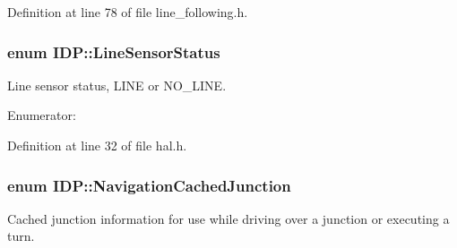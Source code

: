 Definition at line 78 of file line\_\-following.h.

\hypertarget{namespaceIDP_afc3b1d4cbb313bfc854f49d6f23b25f7}{
\subsubsection[{LineSensorStatus}]{\setlength{\rightskip}{0pt plus 5cm}enum {\bf IDP::LineSensorStatus}}}
\label{namespaceIDP_afc3b1d4cbb313bfc854f49d6f23b25f7}


Line sensor status, LINE or NO\_\-LINE. 

\begin{Desc}
\item[Enumerator: ]\par
\begin{description}
\item[{\em 
\hypertarget{namespaceIDP_afc3b1d4cbb313bfc854f49d6f23b25f7ab8f6b528c0b2fd3edfdd6463cc6a2fd2}{
LINE}
\label{namespaceIDP_afc3b1d4cbb313bfc854f49d6f23b25f7ab8f6b528c0b2fd3edfdd6463cc6a2fd2}
}]\item[{\em 
\hypertarget{namespaceIDP_afc3b1d4cbb313bfc854f49d6f23b25f7a8f85d4834fc4519df3f2053201d497d1}{
NO\_\-LINE}
\label{namespaceIDP_afc3b1d4cbb313bfc854f49d6f23b25f7a8f85d4834fc4519df3f2053201d497d1}
}]\end{description}
\end{Desc}



Definition at line 32 of file hal.h.

\hypertarget{namespaceIDP_a628dde0214c4c861deda405e77ad75a2}{
\subsubsection[{NavigationCachedJunction}]{\setlength{\rightskip}{0pt plus 5cm}enum {\bf IDP::NavigationCachedJunction}}}
\label{namespaceIDP_a628dde0214c4c861deda405e77ad75a2}


Cached junction information for use while driving over a junction or executing a turn. 

